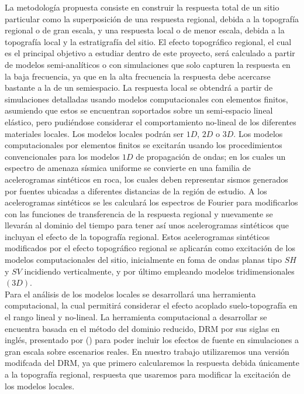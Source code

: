 \documentclass[spanish,letterpaper,12pt,twoside,openany]{article}
\begin{document}
La metodología propuesta consiste en construir la respuesta total de un sitio particular como la superposición de una respuesta regional, debida a la topografía regional o de gran escala, y una respuesta local o de menor escala, debida a la topografía local y la estratigrafía del sitio. El efecto topográfico regional, el cual es el principal objetivo a estudiar dentro de este proyecto, será calculado a partir de modelos semi-analíticos o con simulaciones que solo capturen la respuesta en la baja frecuencia, ya que en la alta frecuencia la respuesta debe acercarse bastante a la de un semiespacio. La respuesta local se obtendrá a partir de simulaciones detalladas usando modelos computacionales con elementos finitos, asumiendo que estos se encuentran soportados sobre un semi-espacio lineal elástico, pero pudiéndose considerar el comportamiento no-lineal de los diferentes materiales locales. Los modelos locales podrán ser $1D$, $2D$ o $3D$. Los modelos computacionales por elementos finitos se excitarán usando los procedimientos convencionales para los modelos $1D$ de propagación de ondas; en los cuales un espectro de amenaza sísmica uniforme se convierte en una familia de acelerogramas sintéticos en roca, los cuales deben representar sismos generados por fuentes ubicadas a diferentes distancias de la región de estudio. A los acelerogramas sintéticos se les calculará los espectros de Fourier para modificarlos con las funciones de transferencia de la respuesta regional y nuevamente se llevarán al dominio del tiempo para tener así unos acelerogramas sintéticos que incluyan el efecto de la topografía regional. Estos acelerogramas sintéticos modificados por el efecto topográfico regional se aplicarán como excitación de los modelos computacionales del sitio, inicialmente en foma de ondas planas tipo $SH$ y $SV$ incidiendo verticalmente, y por último empleando modelos tridimensionales $\left( 3D \right)$.\\
%
Para el análisis de los modelos locales se desarrollará una herramienta computacional, la cual permitirá considerar el efecto acoplado suelo-topografía en el rango lineal y no-lineal. La herramienta computacional a desarrollar se encuentra basada en el método del dominio reducido, DRM por sus siglas en inglés, presentado por \citeauthor{bielak2003} (\citeyear{bielak2003}) para poder incluir los efectos de fuente en simulaciones a gran escala sobre escenarios reales. En nuestro trabajo utilizaremos una versión modifcada del DRM, ya que primero calcularemos la respuesta debida únicamente a la topografía regional, respuesta que usaremos para modificar la excitación de los modelos locales.
\end{document}
